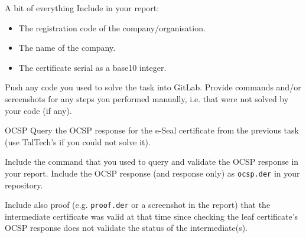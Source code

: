 \documentclass{homework}
\begin{document}
\begin{task}{A bit of everything}
  Include in your report:
  \begin{itemize}
    \item The registration code of the company/organisation.
    \item The name of the company.
    \item The certificate serial as a base10 integer.
  \end{itemize}

  Push any code you used to solve the task into GitLab.
  Provide commands and/or screenshots for any steps you performed manually, i.e. that were not solved by your code (if any).
\end{task}

\begin{task}{OCSP}
  Query the OCSP response for the e-Seal certificate from the previous task (use TalTech's if you could not solve it).

  Include the command that you used to query and validate the OCSP response in your report.
  Include the OCSP response (and response only) as \texttt{ocsp.der} in your repository.

  Include also proof (e.g. \texttt{proof.der} or a screenshot in the report) that the intermediate certificate was valid at that time since checking the leaf certificate's OCSP response does not validate the status of the intermediate(s).
\end{task}
\end{document}

